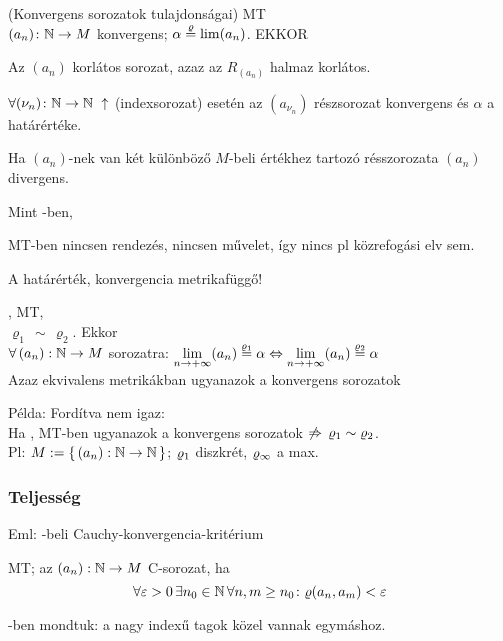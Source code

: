 \begin{te}(Konvergens sorozatok tulajdonságai) \MT MT\\
  $(a_n)\colon \mathbb{N}\to M$ konvergens; $\alpha \stackrel{\varrho}{=} \lim(a_n)$. EKKOR
  \begin{korlista}
  \item Az $(a_n)$ korlátos sorozat, azaz az $R_{(a_n)}$ halmaz
    korlátos.
  \item $\forall (\nu_n)\colon \N\n\N\ \uparrow$ (indexsorozat)
    esetén az $(a_{\nu_n})$ részsorozat konvergens és $\alpha$ a
    határértéke.
  \item Ha $(a_n)$-nek van két különböző $M$-beli értékhez tartozó
    résszorozata \nn $(a_n)$ divergens.
  \end{korlista}
\end{te}

\begin{biz}Mint \R-ben,
\end{biz}
\begin{Megj}
\item MT-ben nincsen rendezés, nincsen művelet, így nincs pl
  közrefogási elv sem.
\item A határérték, konvergencia metrikafüggő!
\end{Megj}

\begin{te}, 
  MT, \\$\varrho_1\,\sim\,\varrho_2$. Ekkor\\
  $\forall\,(a_n): \mathbb{N}\to M$ sorozatra: $\displaystyle\lim_{n\to+\infty}(a_n)
  \stackrel{\varrho_1}{=} \alpha \Leftrightarrow
  \displaystyle\lim_{n\to+\infty}(a_n) \stackrel{\varrho_2}{=} \alpha$\\
  Azaz ekvivalens metrikákban ugyanazok a konvergens sorozatok   
\end{te}


Példa: Fordítva nem igaz:\\
Ha ,  MT-ben ugyanazok a konvergens sorozatok $\not\Rightarrow\,
\varrho_1\sim\varrho_2$.\\
Pl: $M:=\{\,(a_n):\mathbb{N}\to\mathbb{N}\,\}$; $\varrho_1$ diszkrét, $\varrho_\infty$ a max.\\

\subsubsection{Teljesség}
Eml: \R-beli Cauchy-konvergencia-kritérium  
\begin{de}
  \MT MT; az $(a_n): \mathbb{N}\to M$ C-sorozat, ha 
  \[\forall \varepsilon >0\, \exists n_0\in \mathbb{N}\, \forall n,m\geq
  n_0\colon \varrho(a_n,a_m)<\varepsilon\]
\end{de}
\begin{megj}
  \R-ben mondtuk: a nagy indexű tagok közel vannak egymáshoz.
\end{megj}

